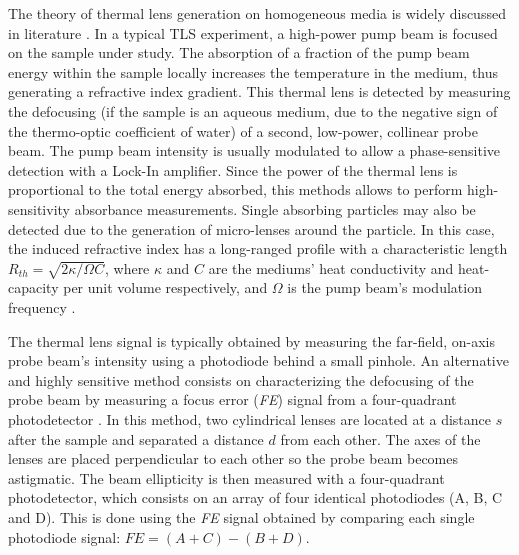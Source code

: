 \documentclass[9pt,twocolumn,twoside]{osajnl}
\newcommand{\FE}{\textit{FE}}
\begin{document}
The theory of thermal lens generation on homogeneous media is widely discussed in literature \cite{Bialkowski2019}. In a typical TLS experiment, a high-power pump beam is focused on the sample under study. The absorption of a fraction of the pump beam energy within the sample locally increases the temperature in the medium, thus generating a refractive index gradient. This thermal lens is detected by measuring the defocusing (if the sample is an aqueous medium, due to the negative sign of the thermo-optic coefficient of water) of a second, low-power, collinear probe beam. The pump beam intensity is usually modulated to allow a phase-sensitive detection with a Lock-In amplifier. Since the power of the thermal lens is proportional to the total energy absorbed, this methods allows to perform high-sensitivity absorbance measurements. Single absorbing particles may also be detected due to the generation of micro-lenses around the particle. In this case, the induced refractive index has a long-ranged profile with a characteristic length $R_{th} = \sqrt{2 \kappa / \Omega C}$, where $\kappa$ and $C$ are the mediums' heat conductivity and heat-capacity per unit volume respectively, and $\Omega$ is the pump beam's modulation frequency \cite{Selmke2015}.


The thermal lens signal is typically obtained by measuring the far-field, on-axis probe beam's intensity using a photodiode behind a small pinhole. An alternative and highly sensitive method consists on characterizing the defocusing of the probe beam by measuring a focus error (\FE{}) signal from a four-quadrant photodetector \cite{Domene2017, ZaldivarEscola2019}. In this method, two cylindrical lenses are located at a distance $s$ after the sample and separated a distance $d$ from each other. The axes of the lenses are placed perpendicular to each other so the probe beam becomes astigmatic. The beam ellipticity is then measured with a four-quadrant photodetector, which consists on an array of four identical photodiodes (A, B, C and D). This is done using the \FE{} signal obtained by comparing each single photodiode signal: $\FE{} = (A+C)-(B+D)$.
\end{document}
